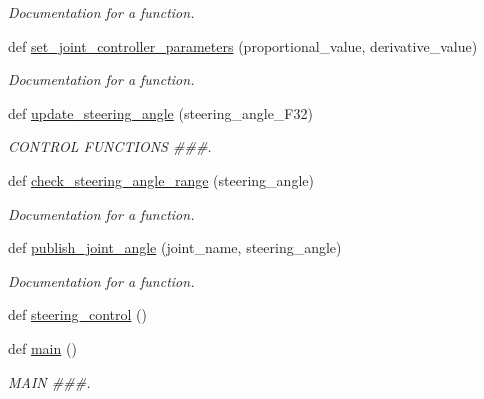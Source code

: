 \begin{DoxyCompactItemize}
\begin{DoxyCompactList}\small\item\em Documentation for a function. \end{DoxyCompactList}\item 
def \mbox{\hyperlink{namespacesteering__simulation_a787fcfa65451a11a9f94afaea6a6e809}{set\+\_\+joint\+\_\+controller\+\_\+parameters}} (proportional\+\_\+value, derivative\+\_\+value)
\begin{DoxyCompactList}\small\item\em Documentation for a function. \end{DoxyCompactList}\item 
def \mbox{\hyperlink{namespacesteering__simulation_ade71f08294031e29a94a9be5cc1f0961}{update\+\_\+steering\+\_\+angle}} (steering\+\_\+angle\+\_\+\+F32)
\begin{DoxyCompactList}\small\item\em C\+O\+N\+T\+R\+OL F\+U\+N\+C\+T\+I\+O\+NS \#\#\#. \end{DoxyCompactList}\item 
def \mbox{\hyperlink{namespacesteering__simulation_abe8ecf85be641d2a56c547e4e27946ba}{check\+\_\+steering\+\_\+angle\+\_\+range}} (steering\+\_\+angle)
\begin{DoxyCompactList}\small\item\em Documentation for a function. \end{DoxyCompactList}\item 
def \mbox{\hyperlink{namespacesteering__simulation_aa303bfd6d5e874d19fda9e678aa4c3d9}{publish\+\_\+joint\+\_\+angle}} (joint\+\_\+name, steering\+\_\+angle)
\begin{DoxyCompactList}\small\item\em Documentation for a function. \end{DoxyCompactList}\item 
def \mbox{\hyperlink{namespacesteering__simulation_a7e6cf517d5eedfae29bc0b05bada6a3e}{steering\+\_\+control}} ()
\item 
def \mbox{\hyperlink{namespacesteering__simulation_af3dec39cd8650ad512084dfda32c577a}{main}} ()
\begin{DoxyCompactList}\small\item\em M\+A\+IN \#\#\#. \end{DoxyCompactList}\end{DoxyCompactItemize}
